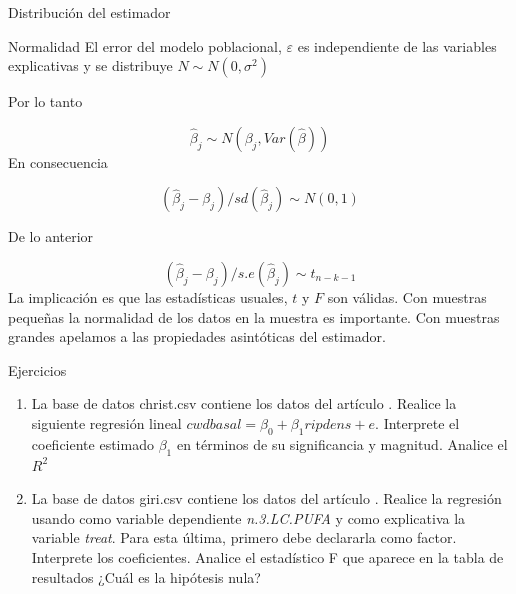 \documentclass{beamer}
\begin{document}
\begin{frame}{Distribución del estimador}

\begin{block}{Normalidad}
El error del modelo poblacional, $\varepsilon$ es independiente de las variables explicativas y se distribuye $N\sim N(0,\sigma^2)$
\end{block}

Por lo tanto

\begin{equation*}
    \hat{\beta}_j\sim N(\beta_j,Var(\hat{\beta}))
\end{equation*}
   En consecuencia

   \begin{equation*}
       (\hat{\beta}_j-\beta_j)/sd(\hat{\beta}_j)\sim N(0,1)
   \end{equation*}

   \end{frame}

\begin{frame}

De lo anterior

\begin{equation*}
       (\hat{\beta}_j-\beta_j)/s.e(\hat{\beta}_j)\sim t_{n-k-1}
   \end{equation*}
   La implicación es que las estadísticas usuales, $t$ y $F$ son válidas. Con muestras pequeñas la normalidad de los datos en la muestra es importante. Con muestras grandes apelamos a las propiedades asintóticas del estimador. 
\end{frame}

\begin{frame}{Ejercicios}

\begin{enumerate}
    \item La base de datos christ.csv contiene los datos del artículo \cite{christ}. Realice la siguiente regresión lineal $cwdbasal=\beta_0+\beta_1ripdens+e$. Interprete el coeficiente estimado $\beta_1$ en términos de su significancia y magnitud. Analice el $R^2$
    \item La base de datos giri.csv contiene los datos del artículo \cite{GIRI2016416}. Realice la regresión usando como variable dependiente \textit{n.3.LC.PUFA} y como explicativa la variable \textit{treat}. Para esta última, primero debe declararla como factor. Interprete los coeficientes. Analice el estadístico F que aparece en la tabla de resultados ¿Cuál es la hipótesis nula? 
\end{enumerate}

\end{frame}
\end{document}
